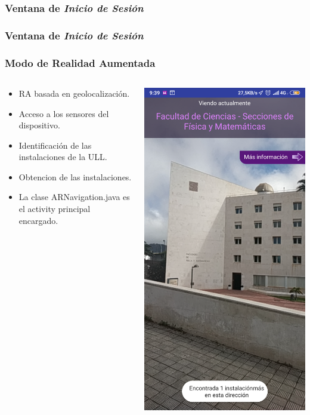  
\begin{frame}
	\frametitle{Ventana de  \textit{Inicio de Sesión}}
	
\end{frame}


\begin{frame}
	\frametitle{Ventana de  \textit{Inicio de Sesión}}
	
\end{frame}

\begin{frame}
	\frametitle{Modo de Realidad Aumentada}
	\begin{columns}
		\begin{column}{0.6\textwidth}
			\begin{itemize}
				\item RA basada en geolocalización.
				\item Acceso a los sensores del dispositivo.
				\item Identificación de las instalaciones de la ULL.
				\item Obtencion de las instalaciones.
				\item La clase ARNavigation.java es el activity principal encargado.
			\end{itemize}
			\endblock{}
		\end{column}
		\begin{column}{0.4\textwidth} 
			\vfill 
			\begin{center}
				\includegraphics[width=0.7\linewidth]{Images/ar}

\end{center}
\end{column}
\end{columns}
\end{frame}
